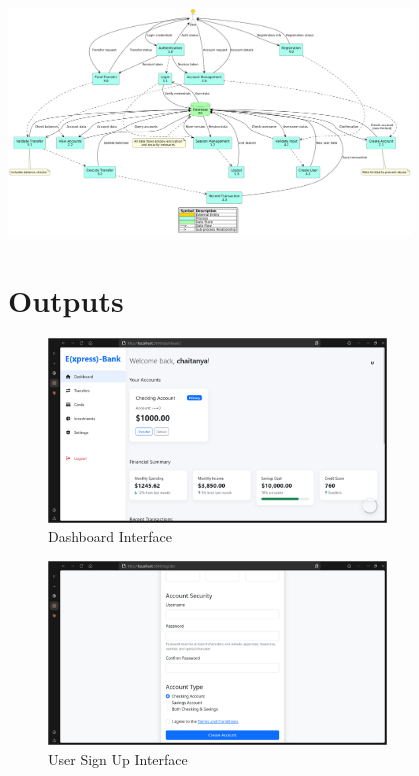 \includegraphics[width=0.8\textwidth, height=0.7\textheight, angle=90]{express_assets/dataflow.png}

\section{Outputs}

\begin{figure}[h]
    \centering
    \includegraphics[width=0.8\textwidth]{express_assets/dashboard.png}
    \caption{Dashboard Interface}
\end{figure}

\begin{figure}[h]
    \centering
    \includegraphics[width=0.8\textwidth]{express_assets/register.png}
    \caption{User Sign Up Interface}
\end{figure}

